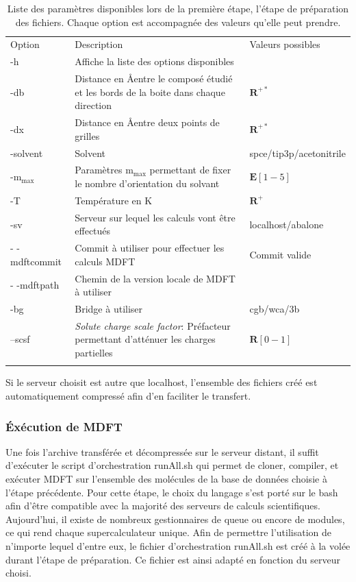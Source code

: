 \begin{table}
  \begin{tabular}{ l p{10cm} p{4cm}}
    \hline & \\[-1em]\hline
    Option   & Description  & Valeurs possibles \\
    \hline
    -h  & Affiche la liste des options disponibles & \\
    -db & Distance en \AA entre le composé étudié et les bords de la boite dans chaque direction & $\mathbf{R}^{+*}$ \\
    -dx & Distance en \AA entre deux points de grilles & $\mathbf{R}^{+*}$ \\
    -solvent & Solvent & spce/tip3p/acetonitrile\\
    -$\mathrm{m}_\mathrm{max}$ & Paramètres $\mathrm{m}_\mathrm{max}$ permettant de fixer le nombre d'orientation du solvant & $\mathbf{E}[1-5]$ \\
    -T & Température en K & $\mathbf{R}^{+}$ \\
    -sv & Serveur sur lequel les calculs vont être effectués & localhost/abalone \\
    - -mdftcommit & Commit à utiliser pour effectuer les calculs MDFT & Commit valide \\
    - -mdftpath & Chemin de la version locale de MDFT à utiliser & \\
    -bg & Bridge à utiliser & cgb/wca/3b \\
    --scsf & \textit{Solute charge scale factor}: Préfacteur permettant d'atténuer les charges partielles & $\mathbf{R}[0-1]$ \\
    \hline & \\[-1em]\hline
  \end{tabular}
  \caption{Liste des paramètres disponibles lors de la première étape, l'étape de préparation des fichiers. Chaque option est accompagnée des valeurs qu'elle peut prendre.}
  \label{tab:processParameters}  
\end{table}

Si le serveur choisit est autre que localhost, l'ensemble des fichiers créé est automatiquement compressé afin d'en faciliter le transfert.


\subsubsection{\'Exécution de MDFT}
Une fois l'archive transférée et décompressée sur le serveur distant, il suffit d’exécuter le script d'orchestration runAll.sh qui permet de cloner, compiler, et exécuter MDFT sur l'ensemble des molécules de la base de données choisie à l'étape précédente. Pour cette étape, le choix du langage s'est porté sur le bash afin d'être compatible avec la majorité des serveurs de calculs scientifiques. Aujourd'hui, il existe de nombreux gestionnaires de queue ou encore de modules, ce qui rend chaque supercalculateur unique. Afin de permettre l'utilisation de n'importe lequel d'entre eux, le fichier d'orchestration runAll.sh est créé à la volée durant l'étape de préparation. Ce fichier est ainsi adapté en fonction du serveur choisi.


